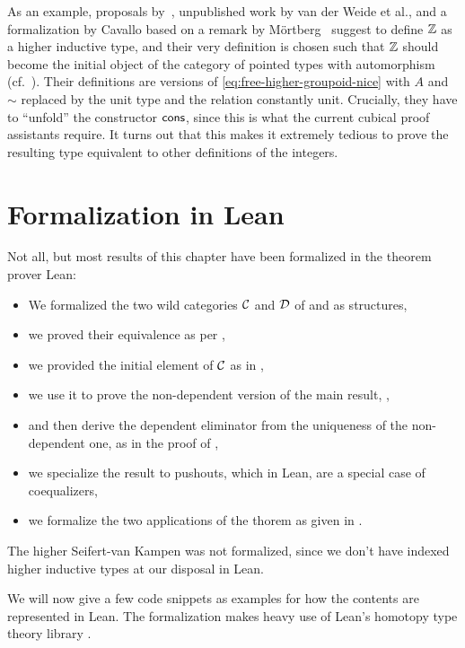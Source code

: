 \begin{remark}
As an example, proposals by~\citet{gun:squid}, unpublished
work by van der Weide et al., and a formalization by Cavallo based on a remark
by M\"ortberg~\citep{Evan:Squid} suggest to define $\mathbb Z$ as a higher inductive
type, and their very definition is chosen such that $\mathbb Z$ should become the
initial object of the category of pointed types with automorphism
(cf.\ ).
Their definitions are versions of \eqref{eq:free-higher-groupoid-nice} with
$A$ and $\sim$ replaced by the unit type and the relation constantly unit.
Crucially, they have to ``unfold'' the constructor $\mathsf{cons}$, since this is
what the current cubical proof assistants require.
It turns out that this makes it extremely tedious to prove the resulting
type equivalent to other definitions of the integers.
\end{remark}

\section{Formalization in Lean}\label{sec:paths-lean}

Not all, but most results of this chapter have been formalized in the
theorem prover Lean:
\begin{itemize}
\item We formalized the two wild categories $\mathcal C$ and $\mathcal D$
of  and  as structures,
\item we proved their equivalence as per ,
\item we provided the initial element of $\mathcal C$ as in ,
\item we use it to prove the non-dependent version of the main result,
,
\item and then derive the dependent eliminator from the uniqueness of
the non-dependent one, as in the proof of ,
\item we specialize the result to pushouts, which in Lean, are a special case of
coequalizers,
\item we formalize the two applications of the thorem as given in
.
\end{itemize}
The higher Seifert-van Kampen was not formalized, since we don't have
indexed higher inductive types at our disposal in Lean.

We will now give a few code snippets as examples for how the contents
are represented in Lean.
The formalization makes heavy use of Lean's homotopy type theory library
\citep{leanhott}.

